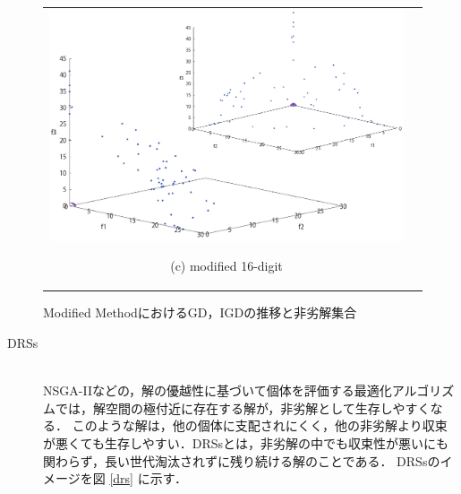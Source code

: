 \documentclass[../main/main]{subfiles}
\begin{document}
\begin{description}
\begin{figure}[htbp]
\begin{tabular}{cc}
\begin{minipage}{0.32\hsize}
\includegraphics[width=1\linewidth]{../figures/DTLZ3mod_double.pdf}
\begin{center}
{\footnotesize (c) modified 16-digit}
\end{center}
\end{minipage}
\end{tabular}
\caption{Modified MethodにおけるGD，IGDの推移と非劣解集合}%
\label{fig:mod}
\end{figure}
%
\clearpage
%

\begin{description}
\item[{\large DRSs}]\mbox{}\\
\quad NSGA-IIなどの，解の優越性に基づいて個体を評価する最適化アルゴリズムでは，解空間の極付近に存在する解が，非劣解として生存しやすくなる．
このような解は，他の個体に支配されにくく，他の非劣解より収束が悪くても生存しやすい．DRSsとは，非劣解の中でも収束性が悪いにも関わらず，長い世代淘汰されずに残り続ける解のことである．
DRSsのイメージを図 \ref{drs} に示す．


\end{description}
\end{description}
\end{document}
